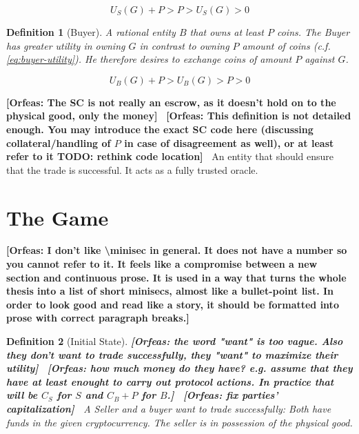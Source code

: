 \documentclass{cacthesis}
\newcommand{\authnote}[3]{{ \footnotesize \textbf{#1[#2: #3]~}}}
\newcommand{\orfnote}[1]{\authnote{\color{blue}}{Orfeas}{#1}}
\newtheorem{definition}{Definition}
\begin{document}
\begin{equation}
\label{eq:seller-utility}
    U_S(G) + P > P > U_S(G) > 0
\end{equation}

\begin{definition}[Buyer]
\label{def:buyer}
A rational entity $B$ that owns at least $P$ coins. The Buyer has greater utility in owning $G$ in contrast to  owning $P$ amount of coins (c.f. \ref{eq:buyer-utility}). He therefore desires to exchange coins of amount $P$ against $G$.
\end{definition}

\begin{equation}
\label{eq:buyer-utility}
    U_B(G) + P > U_B(G) > P > 0
\end{equation}

\orfnote{The SC is not really an escrow, as it doesn't hold on to the physical
good, only the money}
\orfnote{This definition is not detailed enough. You may introduce the exact
SC code here (discussing collateral/handling of $P$ in case of
disagreement as well), or at least refer to it TODO: rethink code location}
 An entity that should ensure that the trade is successful. It acts as a fully trusted oracle.

\section{The Game}
\label{sec:the-game}
\orfnote{I don't like \textbackslash{}minisec in general. It does not have a
number so you cannot refer to it. It feels like a compromise between a new
section and continuous prose. It is used in a way that turns the whole thesis
into a list of short minisecs, almost like a bullet-point list. In order to look
good and read like a story, it should be formatted into prose with correct
paragraph breaks.}

\begin{definition}[Initial State]
\label{def:initial-state}
\orfnote{the word "want" is too vague. Also they don't want to trade
successfully, they "want" to maximize their utility}
\orfnote{how much money do they have? e.g. assume that they have at least
enought to carry out protocol actions. In practice that will be $C_S$ for $S$
and $C_B + P$ for $B$.}
\orfnote{fix parties' capitalization}
A Seller and a buyer want to trade successfully: Both have funds in the given cryptocurrency. The seller is in possession of the physical good.
\end{definition} 
\end{document}
